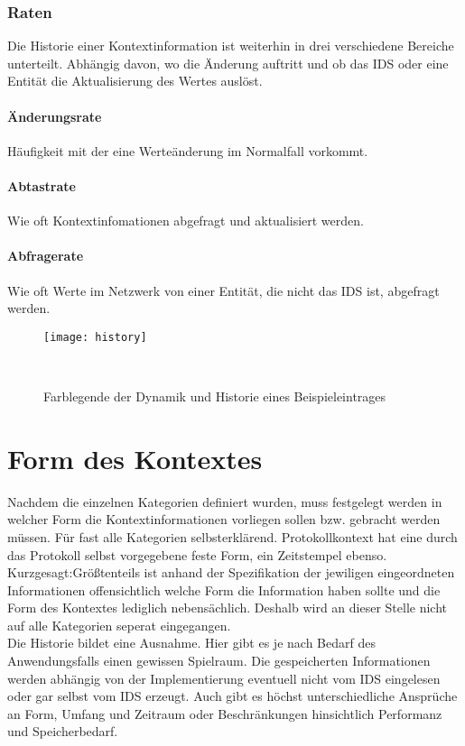 \subsubsection{Raten}
Die Historie einer Kontextinformation ist weiterhin in drei verschiedene Bereiche unterteilt. Abhängig davon, wo die Änderung auftritt und ob das IDS oder eine Entität die Aktualisierung des Wertes auslöst.
\paragraph{Änderungsrate} 
Häufigkeit mit der eine Werteänderung im Normalfall vorkommt.
\paragraph{Abtastrate}
Wie oft Kontextinfomationen abgefragt und aktualisiert werden.
\paragraph{Abfragerate}
Wie oft Werte im Netzwerk von einer Entität, die nicht das IDS ist, abgefragt werden.
\begin{figure}[H]
\centering
\texttt{[image: history]}
\caption{Farblegende der Dynamik und Historie eines Beispieleintrages}
\
\end{figure}


\section{Form des Kontextes}
Nachdem die einzelnen Kategorien definiert wurden, muss festgelegt werden in welcher Form die Kontextinformationen vorliegen sollen bzw. gebracht werden müssen. Für fast alle Kategorien selbsterklärend. Protokollkontext hat eine durch das Protokoll selbst vorgegebene feste Form, ein Zeitstempel ebenso. Kurzgesagt:Größtenteils ist anhand der Spezifikation der jewiligen eingeordneten Informationen offensichtlich welche Form die Information haben sollte und die Form des Kontextes lediglich nebensächlich. Deshalb wird an dieser Stelle nicht auf alle Kategorien seperat eingegangen.\\
Die Historie bildet eine Ausnahme. Hier gibt es je nach Bedarf des Anwendungsfalls einen gewissen Spielraum. Die gespeicherten Informationen werden abhängig von der Implementierung eventuell nicht vom IDS eingelesen oder gar selbst vom IDS erzeugt. Auch gibt es höchst unterschiedliche Ansprüche an Form, Umfang und Zeitraum oder Beschränkungen hinsichtlich Performanz und Speicherbedarf.
